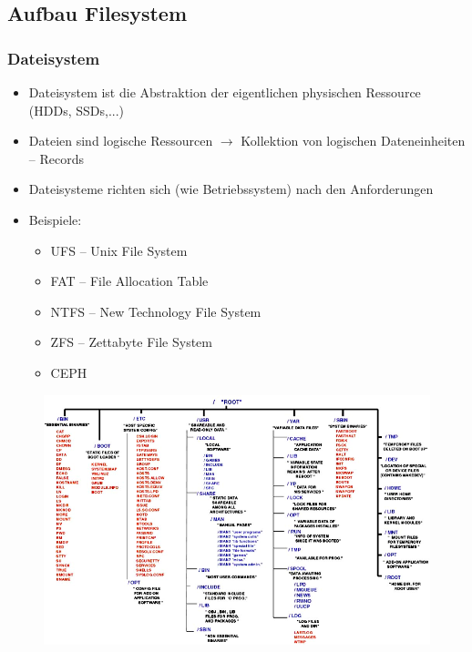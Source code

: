 \documentclass[xcolor=dvipsnames,aspectratio=169]{beamer}
\begin{document}
\subsection{Aufbau Filesystem}
\begin{frame}
	\frametitle{Dateisystem}
	\begin{itemize}
		\item Dateisystem ist die Abstraktion der eigentlichen physischen Ressource (HDDs, SSDs,...)
		\item Dateien sind logische Ressourcen $\rightarrow$ Kollektion von logischen Dateneinheiten -- Records
		\item Dateisysteme richten sich (wie Betriebssystem) nach den Anforderungen
		\item Beispiele:
		\begin{itemize}
			\item UFS -- Unix File System
			\item FAT -- File Allocation Table
			\item NTFS -- New Technology File System
			\item ZFS -- Zettabyte File System
			\item CEPH
		\end{itemize}
	\end{itemize}
\end{frame}

\begin{frame}
\begin{figure}
  \vspace*{-0.225cm}
\includegraphics[scale=0.4]{filesystem}
\end{figure}
\end{frame}
\end{document}
